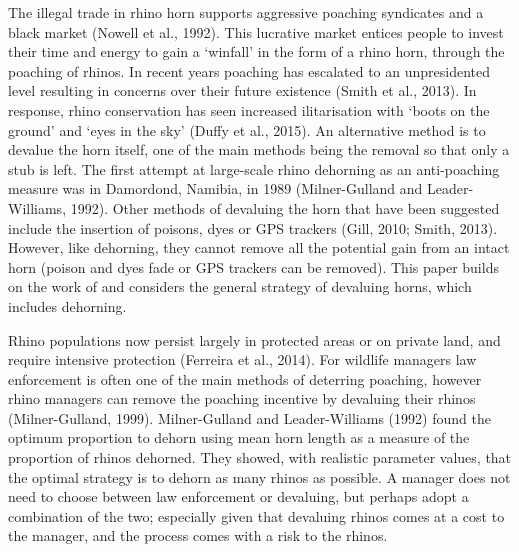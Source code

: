 \documentclass[10pt]{article}
\begin{document}
The illegal trade in rhino horn supports aggressive poaching syndicates and a 
black market (Nowell et al., 1992). This lucrative market entices people to invest
their time and energy to gain a `winfall' in the form of a rhino horn, through the 
poaching of rhinos. In recent years poaching has escalated to an unpresidented 
level resulting in concerns over their future existence (Smith et al., 2013). In 
response, rhino conservation has seen increased  ilitarisation with `boots on the 
ground' and `eyes in the sky' (Duffy et al., 2015). An alternative method is to 
devalue the horn itself, one of the main  methods being the removal so that only
a stub is left. The first attempt at large-scale rhino dehorning as an anti-poaching
measure was in Damordond,  Namibia, in 1989 (Milner-Gulland and Leader-Williams,
1992). Other methods of devaluing the horn that have been suggested include
the insertion of poisons, dyes or GPS trackers (Gill, 2010; Smith, 2013). However, 
like dehorning, they cannot remove all the potential gain from an intact horn 
(poison and dyes fade or GPS trackers can be removed). This paper builds on 
the work of \cite{Lee} and considers the general strategy of devaluing horns,
which includes dehorning.

Rhino populations now persist largely in protected areas or on private land, and
require intensive protection (Ferreira et al., 2014). For wildlife managers law 
enforcement is often one of the main methods of deterring poaching, however 
rhino managers can remove the poaching incentive by devaluing their rhinos 
(Milner-Gulland, 1999). Milner-Gulland and Leader-Williams (1992) found the 
optimum proportion to dehorn using mean horn length as a measure of the 
proportion of rhinos dehorned. They showed, with realistic parameter values, 
that the optimal strategy is to dehorn as many rhinos as possible. 
A manager does not need to choose between law enforcement or devaluing, but
perhaps adopt a combination of the two; especially given that devaluing rhinos 
comes at a cost to the manager, and the process comes with a risk to the rhinos.
\end{document}
